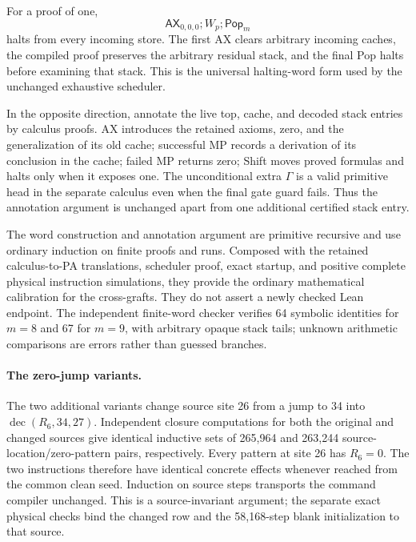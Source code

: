 For a proof of one,
\[
 \mathsf{AX}_{0,0,0};W_p;\mathsf{Pop}_m
\]
halts from every incoming store. The first AX clears arbitrary incoming
caches, the compiled proof preserves the arbitrary residual stack, and
the final Pop halts before examining that stack. This is the universal
halting-word form used by the unchanged exhaustive scheduler.

In the opposite direction, annotate the live top, cache, and decoded stack
entries by calculus proofs. AX introduces the retained axioms, zero, and
the generalization of its old cache; successful MP records a derivation
of its conclusion in the cache; failed MP returns zero; Shift moves proved
formulas and halts only when it exposes one. The unconditional extra
$\Gamma$ is a valid primitive head in the separate calculus even when the
final gate guard fails. Thus the annotation argument is unchanged apart
from one additional certified stack entry.

The word construction and annotation argument are primitive recursive and
use ordinary induction on finite proofs and runs. Composed with the
retained calculus-to-PA translations, scheduler proof, exact startup, and
positive complete physical instruction simulations, they provide the
ordinary mathematical calibration for the cross-grafts. They do not assert
a newly checked Lean endpoint. The independent finite-word checker verifies
64 symbolic identities for $m=8$ and 67 for $m=9$, with arbitrary opaque
stack tails; unknown arithmetic comparisons are errors rather than guessed
branches.

\paragraph{The zero-jump variants.}
The two additional variants change source site 26 from a jump to 34 into
\(\operatorname{dec}(R_6,34,27)\). Independent closure computations for
both the original and changed sources give identical inductive sets of
265,964 and 263,244 source-location/zero-pattern pairs, respectively. Every
pattern at site 26 has $R_6=0$. The two instructions therefore have identical
concrete effects whenever reached from the common clean seed. Induction
on source steps transports the command compiler unchanged. This is a
source-invariant argument; the separate exact physical checks bind the
changed row and the 58,168-step blank initialization to that source.
